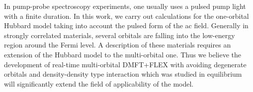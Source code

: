 \vspace*{0.2cm}


In pump-probe spectroscopy experiments, one usually uses a pulsed pump light with a finite duration. In this work, we carry out calculations for the one-orbital Hubbard model taking into account the pulsed form of the ac field. 
Generally in strongly correlated materials, several orbitals are falling into the low-energy region around the Fermi level. A description of these materials requires an extension of the Hubbard model to the multi-orbital one.  
Thus we believe the development of real-time multi-orbital DMFT+FLEX with avoiding degenerate orbitals and density-density type interaction which was studied in equilibrium \citep{PhysRevB.57.6884,PhysRevB.72.115106} will significantly extend the field of applicability of the model. 



\FloatBarrier